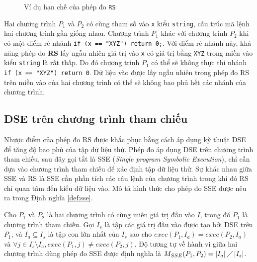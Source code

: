 \begin{figure}[h]
	\centering
	\caption{Ví dụ hạn chế của phép đo \texttt{RS}}
	\label{fig:Hanche-RS}
	\begin{minipage}[t]{0.45\linewidth}
		
	\end{minipage}%
	\hfill\vrule\hfill
	\begin{minipage}[t]{0.45\linewidth}
		
	\end{minipage}%
\end{figure}

Hai chương trình $P_{1}$ và $P_{2}$ có cùng tham số vào \texttt{x} kiểu \texttt{string}, cấu trúc mã lệnh hai chương trình gần giống nhau. Chương trình $P_{1}$ khác với chương trình $P_{2}$ khi có một điểm rẻ nhánh \texttt{if (x == "XYZ") return 0;}. Với điểm rẻ nhánh này, khả năng phép đo \textbf{RS} lấy ngẫu nhiên giá trị vào \texttt{x} có giá trị bằng \texttt{XYZ} trong miền vào kiểu \texttt{string} là rất thấp. Do đó chương trình $P_{1}$ có thể sẽ không thực thi nhánh \texttt{if (x == "XYZ") return 0}. Dữ liệu vào được lấy ngẫu nhiên trong phép đo RS trên miền vào của hai chương trình có thể sẽ không bao phủ hết các nhánh của chương trình.

\subsection{DSE trên chương trình tham chiếu}

Nhược điểm của phép đo RS được khắc phục bằng cách áp dụng kỹ thuật
DSE để tăng độ bao phủ của tập dữ liệu thử. Phép đo áp dụng DSE trên
chương trình tham chiếu, sau đây gọi tắt là SSE (\emph{Single program
  Symbolic Execution}), chỉ cần dựa vào chương trình tham chiếu để xác
định tập dữ liệu thử. Sự khác nhau giữa SSE và RS là SSE cần phần tích
các câu lệnh của chương trình trong khi đó RS chỉ quan tâm đến kiểu dữ
liệu vào. Mô tả hình thức cho phép đo SSE được nêu ra trong Định nghĩa
\ref{def:sse}.

\begin{definition}
  \label{def:sse}
  Cho $P_{1}$ và $P_{2}$ là hai chương trình có cùng miền giá trị đầu
  vào $I$, trong đó $P_{1}$ là chương trình tham chiếu. Gọi $I_{s}$ là
  tập các giá trị đầu vào được tạo bởi DSE trên $P_{1}$, và
  $I_{a} \subseteq I_s$ là tập con lớn nhất của $I_{s}$ sao cho
  $exec(P_{1}, I_a) = exec(P_{2}, I_a)$ và
  $\forall j \in I_{s} \setminus I_{a}, exec(P_{1}, j) \neq
  exec(P_{2}, j)$. Độ tương tự về hành vi giữa hai chương trình dùng
  phép đo SSE được định nghĩa là
  $M_{SSE}(P_{1}, P_{2}) = \left|I_{a}\right| \diagup
  \left|I_{s}\right| $.
\end{definition}

